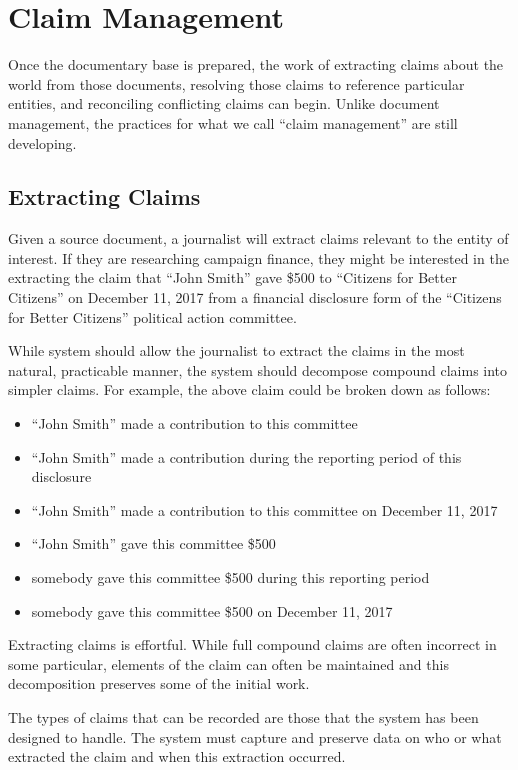 \documentclass[format=siggraph, review=true]{acmart}
\begin{document}
\section{Claim Management}
Once the documentary base is prepared, the work of extracting claims
about the world from those documents, resolving those claims to
reference particular entities, and reconciling conflicting claims can
begin. Unlike document management, the practices for what we call
``claim management'' are still developing.

\subsection{Extracting Claims}
Given a source document, a journalist will extract claims relevant to
the entity of interest. If they are researching campaign finance, they
might be interested in the extracting the claim that ``John Smith''
gave \$500 to ``Citizens for Better Citizens'' on December 11, 2017
from a financial disclosure form of the ``Citizens for Better
Citizens'' political action committee.

While system should allow the journalist to extract the claims in the
most natural, practicable manner, the system should decompose compound
claims into simpler claims. For example, the above
claim could be broken down as follows:

\begin{itemize}
\item ``John Smith'' made a contribution to this committee
\item ``John Smith'' made a contribution during the reporting period of this disclosure
\item ``John Smith'' made a contribution to this committee on December 11, 2017
\item ``John Smith'' gave this committee \$500
\item somebody gave this committee \$500 during this reporting period
\item somebody gave this committee \$500 on December 11, 2017
\end{itemize}

Extracting claims is effortful. While full compound claims are often
incorrect in some particular, elements of the claim can often be
maintained and this decomposition preserves some of the initial work.

The types of claims that can be recorded are those that the system has
been designed to handle. The system must capture and preserve data on
who or what extracted the claim and when this extraction occurred.
\end{document}
